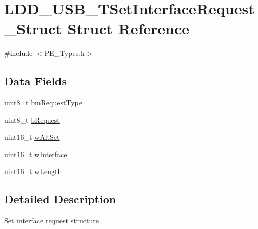 \hypertarget{struct_l_d_d___u_s_b___t_set_interface_request___struct}{\section{L\-D\-D\-\_\-\-U\-S\-B\-\_\-\-T\-Set\-Interface\-Request\-\_\-\-Struct Struct Reference}
\label{struct_l_d_d___u_s_b___t_set_interface_request___struct}
}


{\ttfamily \#include $<$P\-E\-\_\-\-Types.\-h$>$}

\subsection*{Data Fields}
\begin{DoxyCompactItemize}
\item 
uint8\-\_\-t \hyperlink{struct_l_d_d___u_s_b___t_set_interface_request___struct_a1fe15bb3812990d990658d5e22f3742b}{bm\-Request\-Type}
\item 
uint8\-\_\-t \hyperlink{struct_l_d_d___u_s_b___t_set_interface_request___struct_a5caed41b8435790d8f87b9dc86502bde}{b\-Request}
\item 
uint16\-\_\-t \hyperlink{struct_l_d_d___u_s_b___t_set_interface_request___struct_a2aa95c4285e3fa36c3cf7df4bb40f1d0}{w\-Alt\-Set}
\item 
uint16\-\_\-t \hyperlink{struct_l_d_d___u_s_b___t_set_interface_request___struct_a6554d6522c7dcbd0e96cbe945b1725de}{w\-Interface}
\item 
uint16\-\_\-t \hyperlink{struct_l_d_d___u_s_b___t_set_interface_request___struct_a7ccdd1f214e5cebbc10cde359ccba50e}{w\-Length}
\end{DoxyCompactItemize}


\subsection{Detailed Description}
Set interface request structure 


